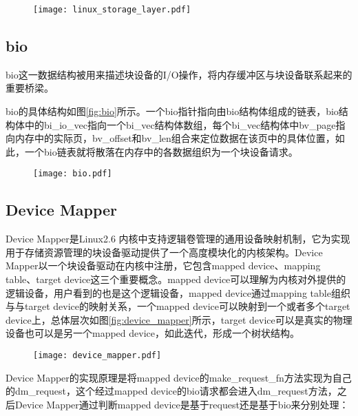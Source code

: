 \begin{figure}[!htp]
    \centering
    \texttt{[image: linux\_storage\_layer.pdf]}
\end{figure}

\subsection{bio}
\label{sec:bio}

bio这一数据结构被用来描述块设备的I/O操作，将内存缓冲区与块设备联系起来的重要桥梁\cite{corbet2005linux}。

bio的具体结构如图\ref{fig:bio}所示。一个bio指针指向由bio结构体组成的链表，bio结构体中的bi\_io\_vec指向一个bi\_vec结构体数组，每个bi\_vec结构体中bv\_page指向内存中的实际页，bv\_offset和bv\_len组合来定位数据在该页中的具体位置，如此，一个bio链表就将散落在内存中的各数据组织为一个块设备请求。

\begin{figure}[!htp]
    \centering
    \texttt{[image: bio.pdf]}
\end{figure}

\subsection{Device Mapper}

Device Mapper是Linux2.6 内核中支持逻辑卷管理的通用设备映射机制，它为实现用于存储资源管理的块设备驱动提供了一个高度模块化的内核架构\cite{bovet2005understanding}。Device Mapper以一个块设备驱动在内核中注册，它包含mapped device、mapping table、target device这三个重要概念。mapped device可以理解为内核对外提供的逻辑设备，用户看到的也是这个逻辑设备，mapped device通过mapping table组织与与target device的映射关系，一个mapped device可以映射到一个或者多个target device上，总体层次如图\ref{fig:device_mapper}所示，target device可以是真实的物理设备也可以是另一个mapped device，如此迭代，形成一个树状结构。

\begin{figure}[!htp]
    \centering
    \texttt{[image: device\_mapper.pdf]}
\end{figure}

Device Mapper的实现原理是将mapped device的make\_request\_fn方法实现为自己的dm\_request，这个经过mapped device的bio请求都会进入dm\_request方法，之后Device Mapper通过判断mapped device是基于request还是基于bio来分别处理：

